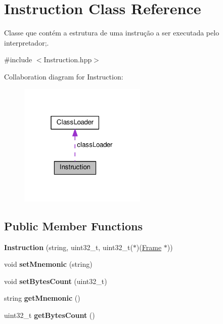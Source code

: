 \hypertarget{classInstruction}{}\section{Instruction Class Reference}
\label{classInstruction}


Classe que contém a estrutura de uma instrução a ser executada pelo interpretador;.  




{\ttfamily \#include $<$Instruction.\+hpp$>$}



Collaboration diagram for Instruction\+:
\nopagebreak
\begin{figure}[H]
\begin{center}
\leavevmode
\includegraphics[width=172pt]{classInstruction__coll__graph}
\end{center}
\end{figure}
\subsection*{Public Member Functions}
\begin{DoxyCompactItemize}
\item 
{\bfseries Instruction} (string, uint32\+\_\+t, uint32\+\_\+t($\ast$)(\hyperlink{classFrame}{Frame} $\ast$))\hypertarget{classInstruction_a796b0697656d6d1230d94f942680245b}{}\label{classInstruction_a796b0697656d6d1230d94f942680245b}

\item 
void {\bfseries set\+Mnemonic} (string)\hypertarget{classInstruction_a507efd4e2f184c09f4349b682479bfb5}{}\label{classInstruction_a507efd4e2f184c09f4349b682479bfb5}

\item 
void {\bfseries set\+Bytes\+Count} (uint32\+\_\+t)\hypertarget{classInstruction_a963419f34dc60eba3f5e5d8aa86da6f2}{}\label{classInstruction_a963419f34dc60eba3f5e5d8aa86da6f2}

\item 
string {\bfseries get\+Mnemonic} ()\hypertarget{classInstruction_a467cd8f7f8f8d22c9d3d26c9dbbb6b97}{}\label{classInstruction_a467cd8f7f8f8d22c9d3d26c9dbbb6b97}

\item 
uint32\+\_\+t {\bfseries get\+Bytes\+Count} ()\hypertarget{classInstruction_a0cc76fd49fa6bc6f7ec395484fa18cb3}{}\label{classInstruction_a0cc76fd49fa6bc6f7ec395484fa18cb3}

\end{DoxyCompactItemize}
